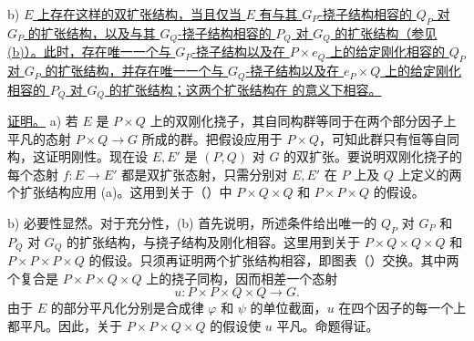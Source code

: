 \medskip
\noindent
b) \underline{$E$ 上存在这样的双扩张结构，当且仅当 $E$ 有与其 $G_P$-挠子结构相容的 $Q_P$ 对 $G_P$ 的扩张结构，以及与其 $G_Q$-挠子结构相容的 $P_Q$ 对 $G_Q$ 的扩张结构（参见 (b)）。此时，存在唯一一个与 $G_P$-挠子结构以及在 $P\times e_Q$ 上的给定刚化相容的 $Q_P$ 对 $G_P$ 的扩张结构，并存在唯一一个与 $G_Q$-挠子结构以及在 $e_P\times Q$ 上的给定刚化相容的 $P_Q$ 对 $G_Q$ 的扩张结构；这两个扩张结构在  的意义下相容。}

\underline{证明。} a) 若 $E$ 是 $P\times Q$ 上的双刚化挠子，其自同构群等同于在两个部分因子上平凡的态射 $P\times Q\longrightarrow G$ 所成的群。把假设应用于 $P\times Q$，可知此群只有恒等自同构，这证明刚性。现在设 $E,E'$ 是 $(P,Q)$ 对 $G$ 的双扩张。要说明双刚化挠子的每个态射 $f:E\longrightarrow E'$ 都是双扩张态射，只需分别对 $E,E'$ 在 $P$ 上及 $Q$ 上定义的两个扩张结构应用 (a)。这用到关于（）中 $P\times Q\times Q$ 和 $P\times P\times Q$ 的假设。

\noindent
b) 必要性显然。对于充分性，(b) 首先说明，所述条件给出唯一的 $Q_P$ 对 $G_P$ 和 $P_Q$ 对 $G_Q$ 的扩张结构，与挠子结构及刚化相容。这里用到关于 $P\times Q\times Q\times Q$ 和 $P\times P\times P\times Q$ 的假设。只须再证明两个扩张结构相容，即图表（）交换。其中两个复合是 $P\times P\times Q\times Q$ 上的挠子同构，因而相差一个态射
\[
 u:P\times P\times Q\times Q\longrightarrow G.
\]
由于 $E$ 的部分平凡化分别是合成律 $\varphi$ 和 $\psi$ 的单位截面，$u$ 在四个因子的每一个上都平凡。因此，关于 $P\times P\times Q\times Q$ 的假设使 $u$ 平凡。命题得证。




